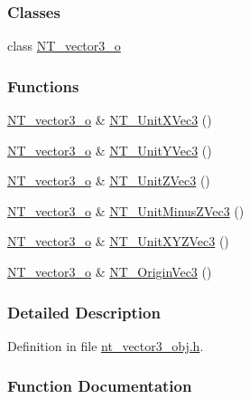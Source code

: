 \subsubsection*{Classes}
\begin{DoxyCompactItemize}
\item 
class \hyperlink{class_n_t__vector3__o}{NT\_\-vector3\_\-o}
\end{DoxyCompactItemize}
\subsubsection*{Functions}
\begin{DoxyCompactItemize}
\item 
\hyperlink{class_n_t__vector3__o}{NT\_\-vector3\_\-o} \& \hyperlink{nt__vector3__obj_8h_ae70adf1fe9c86220ce61ea325846a421}{NT\_\-UnitXVec3} ()
\item 
\hyperlink{class_n_t__vector3__o}{NT\_\-vector3\_\-o} \& \hyperlink{nt__vector3__obj_8h_a0d21d3bfa23ef05444f540006964eebc}{NT\_\-UnitYVec3} ()
\item 
\hyperlink{class_n_t__vector3__o}{NT\_\-vector3\_\-o} \& \hyperlink{nt__vector3__obj_8h_aef1434180e7e6b2e4ca4cde5532fa4f2}{NT\_\-UnitZVec3} ()
\item 
\hyperlink{class_n_t__vector3__o}{NT\_\-vector3\_\-o} \& \hyperlink{nt__vector3__obj_8h_ac9923e63d2a73f41552bf38a9c109c8b}{NT\_\-UnitMinusZVec3} ()
\item 
\hyperlink{class_n_t__vector3__o}{NT\_\-vector3\_\-o} \& \hyperlink{nt__vector3__obj_8h_a8c96a26d15c49a10662c01db5e625248}{NT\_\-UnitXYZVec3} ()
\item 
\hyperlink{class_n_t__vector3__o}{NT\_\-vector3\_\-o} \& \hyperlink{nt__vector3__obj_8h_a149a58edcf1e97ae7e2ed1ac2f3b7f22}{NT\_\-OriginVec3} ()
\end{DoxyCompactItemize}


\subsubsection{Detailed Description}


Definition in file \hyperlink{nt__vector3__obj_8h_source}{nt\_\-vector3\_\-obj.h}.



\subsubsection{Function Documentation}
